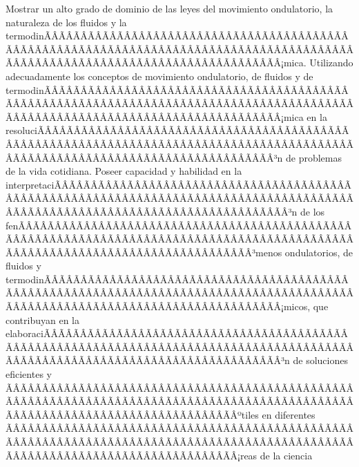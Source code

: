\begin{sumilla}


\begin{fundamentacion}
Mostrar un alto grado de dominio de las leyes del movimiento ondulatorio, la naturaleza de los fluidos y la termodinÃÂÃÂÃÂÃÂÃÂÃÂÃÂÃÂÃÂÃÂÃÂÃÂÃÂÃÂÃÂÃÂÃÂÃÂÃÂÃÂÃÂÃÂÃÂÃÂÃÂÃÂÃÂÃÂÃÂÃÂÃÂÃÂÃÂÃÂÃÂÃÂÃÂÃÂÃÂÃÂÃÂÃÂÃÂÃÂÃÂÃÂÃÂÃÂÃÂÃÂÃÂÃÂÃÂÃÂÃÂÃÂÃÂÃÂÃÂÃÂÃÂÃÂÃÂÃÂ¡mica. Utilizando adecuadamente los conceptos de movimiento ondulatorio, de fluidos y de termodinÃÂÃÂÃÂÃÂÃÂÃÂÃÂÃÂÃÂÃÂÃÂÃÂÃÂÃÂÃÂÃÂÃÂÃÂÃÂÃÂÃÂÃÂÃÂÃÂÃÂÃÂÃÂÃÂÃÂÃÂÃÂÃÂÃÂÃÂÃÂÃÂÃÂÃÂÃÂÃÂÃÂÃÂÃÂÃÂÃÂÃÂÃÂÃÂÃÂÃÂÃÂÃÂÃÂÃÂÃÂÃÂÃÂÃÂÃÂÃÂÃÂÃÂÃÂÃÂ¡mica en la resoluciÃÂÃÂÃÂÃÂÃÂÃÂÃÂÃÂÃÂÃÂÃÂÃÂÃÂÃÂÃÂÃÂÃÂÃÂÃÂÃÂÃÂÃÂÃÂÃÂÃÂÃÂÃÂÃÂÃÂÃÂÃÂÃÂÃÂÃÂÃÂÃÂÃÂÃÂÃÂÃÂÃÂÃÂÃÂÃÂÃÂÃÂÃÂÃÂÃÂÃÂÃÂÃÂÃÂÃÂÃÂÃÂÃÂÃÂÃÂÃÂÃÂÃÂÃÂÃÂ³n de problemas de la vida cotidiana. Poseer capacidad y habilidad en la interpretaciÃÂÃÂÃÂÃÂÃÂÃÂÃÂÃÂÃÂÃÂÃÂÃÂÃÂÃÂÃÂÃÂÃÂÃÂÃÂÃÂÃÂÃÂÃÂÃÂÃÂÃÂÃÂÃÂÃÂÃÂÃÂÃÂÃÂÃÂÃÂÃÂÃÂÃÂÃÂÃÂÃÂÃÂÃÂÃÂÃÂÃÂÃÂÃÂÃÂÃÂÃÂÃÂÃÂÃÂÃÂÃÂÃÂÃÂÃÂÃÂÃÂÃÂÃÂÃÂ³n de los fenÃÂÃÂÃÂÃÂÃÂÃÂÃÂÃÂÃÂÃÂÃÂÃÂÃÂÃÂÃÂÃÂÃÂÃÂÃÂÃÂÃÂÃÂÃÂÃÂÃÂÃÂÃÂÃÂÃÂÃÂÃÂÃÂÃÂÃÂÃÂÃÂÃÂÃÂÃÂÃÂÃÂÃÂÃÂÃÂÃÂÃÂÃÂÃÂÃÂÃÂÃÂÃÂÃÂÃÂÃÂÃÂÃÂÃÂÃÂÃÂÃÂÃÂÃÂÃÂ³menos ondulatorios, de fluidos y termodinÃÂÃÂÃÂÃÂÃÂÃÂÃÂÃÂÃÂÃÂÃÂÃÂÃÂÃÂÃÂÃÂÃÂÃÂÃÂÃÂÃÂÃÂÃÂÃÂÃÂÃÂÃÂÃÂÃÂÃÂÃÂÃÂÃÂÃÂÃÂÃÂÃÂÃÂÃÂÃÂÃÂÃÂÃÂÃÂÃÂÃÂÃÂÃÂÃÂÃÂÃÂÃÂÃÂÃÂÃÂÃÂÃÂÃÂÃÂÃÂÃÂÃÂÃÂÃÂ¡micos, que contribuyan en la elaboraciÃÂÃÂÃÂÃÂÃÂÃÂÃÂÃÂÃÂÃÂÃÂÃÂÃÂÃÂÃÂÃÂÃÂÃÂÃÂÃÂÃÂÃÂÃÂÃÂÃÂÃÂÃÂÃÂÃÂÃÂÃÂÃÂÃÂÃÂÃÂÃÂÃÂÃÂÃÂÃÂÃÂÃÂÃÂÃÂÃÂÃÂÃÂÃÂÃÂÃÂÃÂÃÂÃÂÃÂÃÂÃÂÃÂÃÂÃÂÃÂÃÂÃÂÃÂÃÂ³n de soluciones eficientes y ÃÂÃÂÃÂÃÂÃÂÃÂÃÂÃÂÃÂÃÂÃÂÃÂÃÂÃÂÃÂÃÂÃÂÃÂÃÂÃÂÃÂÃÂÃÂÃÂÃÂÃÂÃÂÃÂÃÂÃÂÃÂÃÂÃÂÃÂÃÂÃÂÃÂÃÂÃÂÃÂÃÂÃÂÃÂÃÂÃÂÃÂÃÂÃÂÃÂÃÂÃÂÃÂÃÂÃÂÃÂÃÂÃÂÃÂÃÂÃÂÃÂÃÂÃÂÃÂºtiles en diferentes ÃÂÃÂÃÂÃÂÃÂÃÂÃÂÃÂÃÂÃÂÃÂÃÂÃÂÃÂÃÂÃÂÃÂÃÂÃÂÃÂÃÂÃÂÃÂÃÂÃÂÃÂÃÂÃÂÃÂÃÂÃÂÃÂÃÂÃÂÃÂÃÂÃÂÃÂÃÂÃÂÃÂÃÂÃÂÃÂÃÂÃÂÃÂÃÂÃÂÃÂÃÂÃÂÃÂÃÂÃÂÃÂÃÂÃÂÃÂÃÂÃÂÃÂÃÂÃÂ¡reas de la ciencia 
\end{fundamentacion}
\end{sumilla}
